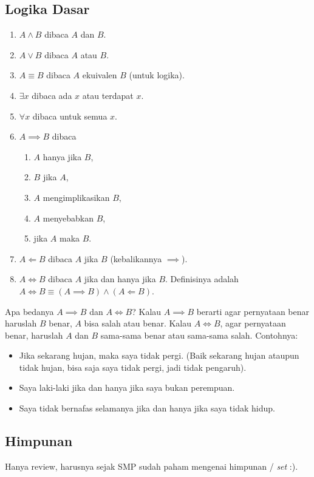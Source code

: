 	\subsection{Logika Dasar}
	\begin{enumerate}
	    \item $A \land B$ dibaca $A$ dan $B$.
	    \item $A \lor B$ dibaca $A$ atau $B$.
	    \item $A \equiv B$ dibaca $A$ ekuivalen $B$ (untuk logika).
	    \item $\exists x$ dibaca ada $x$ atau terdapat $x$.
	    \item $\forall x$ dibaca untuk semua $x$.
	    \item $A \implies B$ dibaca
	    \begin{enumerate}
	        \item $A$ hanya jika $B$,
	        \item $B$ jika $A$,
	        \item $A$ mengimplikasikan $B$,
	        \item $A$ menyebabkan $B$,
	        \item jika $A$ maka $B$.
	    \end{enumerate}
	    \item $A \Longleftarrow B$ dibaca $A$ jika $B$ (kebalikannya $\implies$).
	    \item $A \iff B$ dibaca $A$ jika dan hanya jika $B$. Definisinya adalah $A \iff B \equiv (A \implies B) \land (A \Longleftarrow B)$.
	\end{enumerate}
	Apa bedanya $A \implies B$ dan $A \iff B$? Kalau $A \implies B$ berarti agar pernyataan benar haruslah $B$ benar, $A$ bisa salah atau benar. Kalau $A \iff B$, agar pernyataan benar, haruslah $A$ dan $B$ sama-sama benar atau sama-sama salah. Contohnya:
	\begin{itemize}
	    \item Jika sekarang hujan, maka saya tidak pergi. (Baik sekarang hujan ataupun tidak hujan, bisa saja saya tidak pergi, jadi tidak pengaruh).
	    \item Saya laki-laki jika dan hanya jika saya bukan perempuan.
            \item Saya tidak bernafas selamanya jika dan hanya jika saya tidak hidup.
	\end{itemize}
	\subsection{Himpunan}
	Hanya review, harusnya sejak SMP sudah paham mengenai himpunan / \textit{set} :).
	
